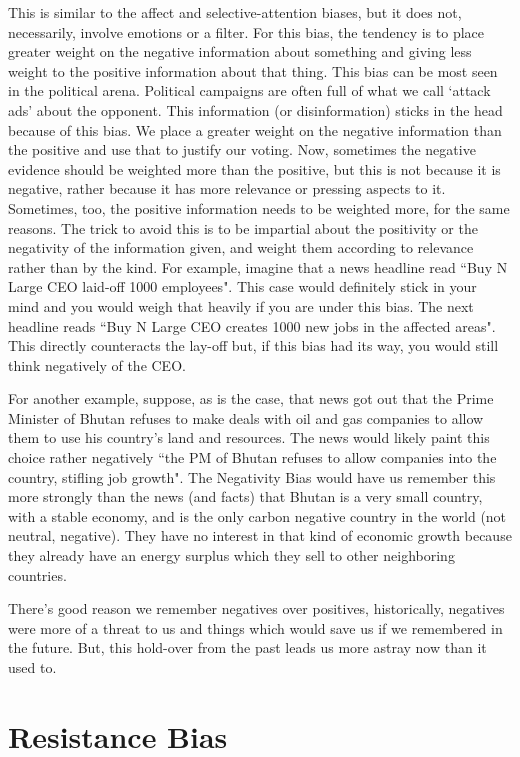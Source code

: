 This is similar to the affect and selective-attention biases, but it does not, necessarily, involve emotions or a filter. For this bias, the tendency is to place greater weight on the negative information about something and giving less weight to the positive information about that thing. This bias can be most seen in the political arena. Political campaigns are often full of what we call `attack ads' about the opponent. This information (or disinformation) sticks in the head because of this bias. We place a greater weight on the negative information than the positive and use that to justify our voting. Now, sometimes the negative evidence should be weighted more than the positive, but this is not because it is negative, rather because it has more relevance or pressing aspects to it. Sometimes, too, the positive information needs to be weighted more, for the same reasons. The trick to avoid this is to be impartial about the positivity or the negativity of the information given, and weight them according to relevance rather than by the kind. For example, imagine that a news headline read ``Buy N Large CEO laid-off 1000 employees". This case would definitely stick in your mind and you would weigh that heavily if you are under this bias. The next headline reads ``Buy N Large CEO creates 1000 new jobs in the affected areas". This directly counteracts the lay-off but, if this bias had its way, you would still think negatively of the CEO.

For another example, suppose, as is the case, that news got out that the Prime Minister of Bhutan refuses to make deals with oil and gas companies to allow them to use his country's land and resources. The news would likely paint this choice rather negatively ``the PM of Bhutan refuses to allow companies into the country, stifling job growth".  The Negativity Bias would have us remember this more strongly than the news  (and facts) that Bhutan is a very small country, with a stable economy, and is the only carbon negative country in the world (not neutral, negative). They have no interest in that kind of economic growth because they already have an energy surplus which they sell to other neighboring countries. 

There's good reason we remember negatives over positives, historically, negatives were more of a threat to us and things which would save us if we remembered in the future. But, this hold-over from the past leads us more astray now than it used to.
\section{Resistance Bias}

